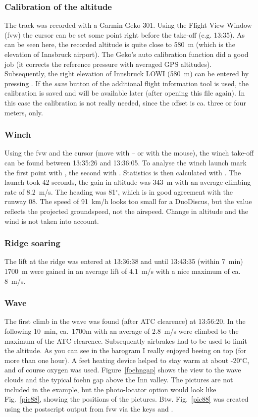 \subsubsection{Calibration of the altitude}
The track was recorded with a Garmin Geko 301.
Using the Flight View Window (fvw) the cursor can be set some point right before the take-off (e.g. 13:35).
As can be seen here, the recorded altitude is quite close to 580~m (which is the elevation of Innsbruck airport). The Geko's
auto calibration function did a good job (it corrects the reference pressure with averaged GPS altitudes).
Subsequently, the right elevation of Innsbruck LOWI (580~m) can be entered by pressing . If the \emph{save} button of the additional flight information tool is used, the calibration is saved and will be available later (after opening this file again). In this case the calibration is not really needed, since the offset is ca. three or four meters, only.

\subsubsection{Winch}
Using the fvw and the cursor (move with -- or with the mouse), the winch take-off can be found between 13:35:26 and 13:36:05. To analyse the winch launch mark the first point with , the second with . Statistics is then calculated with .
The launch took 42 seconds, the gain in altitude was 343~m with an average climbing rate of 8.2~m/s. The heading was 81$^\circ$, which is in good agreement with the runway 08. The speed of 91~km/h looks too small for a DuoDiscus, but the value reflects the projected groundspeed, not the airspeed. Change in altitude and the wind is not taken into account.

\subsubsection{Ridge soaring}
The lift at the ridge was entered at 13:36:38 and until 13:43:35 (within 7~min) 1700~m were gained in an average lift of 4.1~m/s with a nice maximum of ca. 8~m/s.

\subsubsection{Wave}
The first climb in the wave was found (after ATC clearence) at 13:56:20. In the following 10~min, ca.~1700m with an average of 2.8~m/s were climbed to the maximum of the ATC clearence. Subsequently airbrakes had to be used to limit the altitude.
As you can see in the barogram I really enjoyed beeing on top (for more than one hour). A feet heating device helped to stay warm at about -20$^\circ$C, and of course oxygen was used. Figure~\ref{foehngap} shows the view to the wave clouds and the typical foehn gap above the Inn valley.
The pictures are not included in the example, but the photo-locator option would look like Fig.~\ref{pic88}, showing the positions of the pictures. Btw. Fig.~\ref{pic88} was created using the postscript output from fvw via the keys  and .

